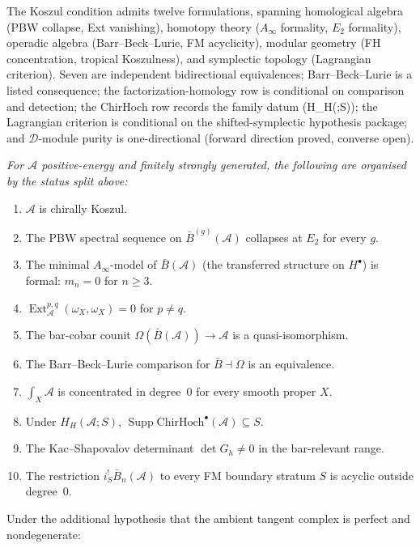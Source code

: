 \documentclass[11pt,reqno]{amsart}
\theoremstyle{definition}
\theoremstyle{remark}
\providecommand{\cA}{\mathcal{A}}
\providecommand{\barB}{\bar{B}}
\providecommand{\ChirHoch}{\mathrm{ChirHoch}}
\numberwithin{equation}{section}
\begin{document}
The Koszul condition admits twelve formulations, spanning homological
algebra (PBW collapse, Ext vanishing), homotopy theory ($A_\infty$
formality, $E_2$ formality), operadic algebra
(Barr--Beck--Lurie, FM acyclicity), modular geometry (FH
concentration, tropical Koszulness), and symplectic topology
(Lagrangian criterion). Seven are independent bidirectional
equivalences; Barr--Beck--Lurie is a listed consequence; the
factorization-homology row is conditional on comparison and detection;
the ChirHoch row records the family datum (H_H(\cA;S)); the
Lagrangian criterion is
conditional on the shifted-symplectic hypothesis package; and
$\mathcal D$-module purity is one-directional (forward direction
proved, converse open).

\begin{center}
\emph{For $\cA$ positive-energy and finitely strongly generated, the
following are organised by the status split above:}
\end{center}

\begin{enumerate}[label=\textup{(\roman*)},nosep]
\item $\cA$ is chirally Koszul.
\item The PBW spectral sequence on $\barB^{(g)}(\cA)$ collapses at $E_2$ for every $g$.
\item The minimal $A_\infty$-model of $\barB(\cA)$ (the transferred structure on $H^\bullet$) is formal: $m_n=0$ for $n\ge 3$.
\item $\operatorname{Ext}^{p,q}_\cA(\omega_X,\omega_X)=0$ for $p\neq q$.
\item The bar-cobar counit $\Omega(\barB(\cA))\to\cA$ is a quasi-isomorphism.
\item The Barr--Beck--Lurie comparison for $\barB\dashv\Omega$ is an equivalence.
\item $\int_X\cA$ is concentrated in degree~$0$ for every smooth proper $X$.
\item Under \(H_H(\cA;S)\),
\(\operatorname{Supp}\ChirHoch^\bullet(\cA)\subseteq S\).
\item The Kac--Shapovalov determinant $\det G_h\neq 0$ in the bar-relevant range.
\item The restriction $i_S^!\barB_n(\cA)$ to every FM boundary stratum $S$ is acyclic outside degree~$0$.
\end{enumerate}

\noindent
Under the additional hypothesis that the ambient tangent complex is
perfect and nondegenerate:
\end{document}
